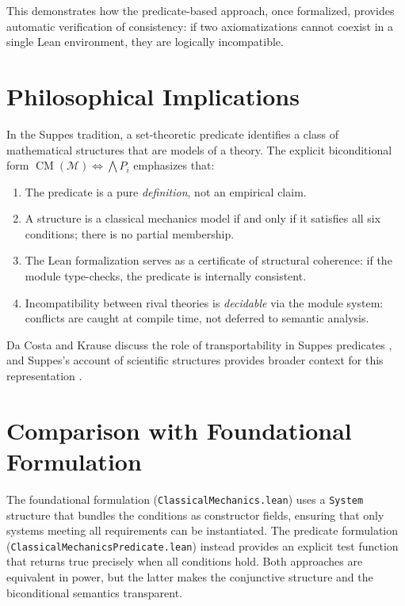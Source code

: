 \documentclass[11pt]{article}
\begin{document}
This demonstrates how the predicate-based approach, once formalized, provides
automatic verification of consistency: if two axiomatizations cannot coexist
in a single Lean environment, they are logically incompatible.

\section{Philosophical Implications}

In the Suppes tradition, a set-theoretic predicate identifies a class of
mathematical structures that are models of a theory. The explicit biconditional
form $\operatorname{CM}(\mathcal{M}) \iff \bigwedge P_i$ emphasizes that:

\begin{enumerate}
  \item The predicate is a pure \textit{definition}, not an empirical claim.
  \item A structure is a classical mechanics model if and only if it satisfies
    all six conditions; there is no partial membership.
  \item The Lean formalization serves as a certificate of structural coherence:
    if the module type-checks, the predicate is internally consistent.
  \item Incompatibility between rival theories is \textit{decidable} via the
    module system: conflicts are caught at compile time, not deferred to
    semantic analysis.
\end{enumerate}
Da Costa and Krause discuss the role of transportability in Suppes predicates
\cite{daCostaKrause2020}, and Suppes's account of scientific structures
provides broader context for this representation
\cite{suppes2002representation}.

\section{Comparison with Foundational Formulation}

The foundational formulation (\texttt{ClassicalMechanics.lean}) uses a
\texttt{System} structure that bundles the conditions as constructor fields,
ensuring that only systems meeting all requirements can be instantiated. The
predicate formulation (\texttt{ClassicalMechanicsPredicate.lean}) instead
provides an explicit test function that returns true precisely when all
conditions hold. Both approaches are equivalent in power, but the latter
makes the conjunctive structure and the biconditional semantics transparent.



\end{document}
